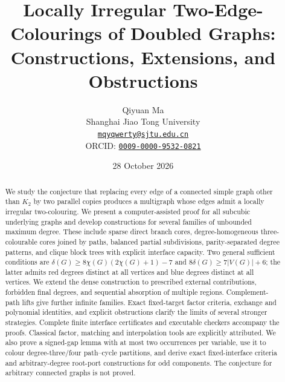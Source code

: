 \documentclass[11pt]{article}
\title{Locally Irregular Two-Edge-Colourings of Doubled Graphs:\\Constructions, Extensions, and Obstructions}
\author{Qiyuan Ma\\Shanghai Jiao Tong University\\{\small\href{mailto:mqyqwerty@sjtu.edu.cn}{\texttt{mqyqwerty@sjtu.edu.cn}}}\\{\small ORCID: \href{https://orcid.org/0009-0000-9532-0821}{\texttt{0009-0000-9532-0821}}}}
\date{28 October 2026}
\makeatletter
\theoremstyle{definition}
\newcommand{\compactcontents}{\begingroup\small
\renewcommand{\l@section}{\@dottedtocline{1}{0pt}{2em}}
\tableofcontents\endgroup}
\makeatother
\begin{document}
\maketitle
\begin{abstract}
We study the conjecture that replacing every edge of a connected simple
graph other than $K_2$ by two parallel copies produces a multigraph whose
edges admit a locally irregular two-colouring. We present a
computer-assisted proof for all subcubic underlying graphs and develop
constructions for several families of unbounded maximum degree. These
include sparse direct branch cores, degree-homogeneous three-colourable
cores joined by paths, balanced partial subdivisions, parity-separated
degree patterns, and clique block trees with explicit interface capacity.
Two general sufficient conditions are
$\delta(G)\ge8\chi(G)(2\chi(G)+1)-7$ and
$8\delta(G)\ge7|V(G)|+6$; the latter admits red degrees distinct at all
vertices and blue degrees distinct at all vertices. We extend the dense
construction to prescribed external contributions, forbidden final
degrees, and sequential absorption of multiple regions. Complement-path
lifts give further infinite families. Exact fixed-target factor criteria,
exchange and polynomial identities, and explicit obstructions clarify
the limits of several stronger strategies. Complete finite interface
certificates and executable checkers accompany the proofs. Classical
factor, matching and interpolation tools are explicitly attributed.
We also prove a signed-gap lemma with at most two occurrences per
variable, use it to colour degree-three/four path--cycle partitions,
and derive exact fixed-interface criteria and arbitrary-degree
root-port constructions for odd components.
The conjecture for arbitrary connected graphs is not proved.
\end{abstract}
\clearpage
\compactcontents
\clearpage















\end{document}
